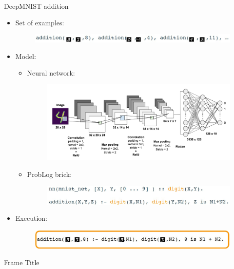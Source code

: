 \begin{frame}{DeepMNIST addition}
    
\begin{itemize}
    \item Set of examples:
    \begin{figure}
        \centering
        \includegraphics[scale=0.35]{images/DeepProbLog - Examples.jpg}
    \end{figure}
    \item Model:
    \begin{itemize}
        \item Neural network:
        \begin{figure}
            \centering
            \includegraphics[scale=0.1]{images/ExampleOfNN.png}
        \end{figure}
        \item ProbLog brick:
    \begin{figure}
        \centering
        \includegraphics[scale=0.3]{images/ProbLog brick.jpg}
    \end{figure}
    \end{itemize}
    \item Execution:
    \begin{figure}
        \centering
        \includegraphics[scale=0.3]{images/3+5 example.jpg}
    \end{figure}
\end{itemize}    

\end{frame}

\begin{frame}{Frame Title}
    
\end{frame}